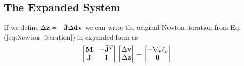 \subsection{The Expanded System}
If we define $\Delta{\mathbf{z}}=-\bar{{\mathbf{J}}}\Delta{\mathbf{dv}}$ we can write the original
Newton iteration from Eq. (\ref{eq:Newton_iteration}) in expanded form as
\begin{eqnarray}
	\begin{bmatrix}
		{\mathbf{M}} & -\bar{{\mathbf{J}}}^T\\
		\bar{{\mathbf{J}}} & {\mathbf{I}}
	\end{bmatrix}
	\begin{bmatrix}
		\Delta{\mathbf{v}}\\
		\Delta{\mathbf{z}} \end{bmatrix}=
	\begin{bmatrix}
		-\nabla_{\mathbf{v}}\ell_p\\
		{\mathbf{0}}
	\end{bmatrix}	
\end{eqnarray}
